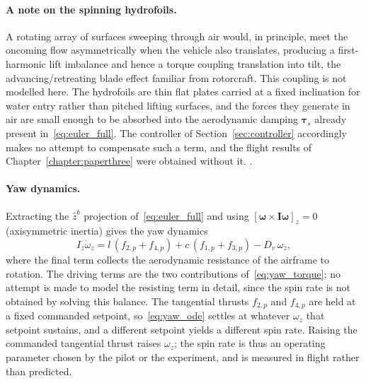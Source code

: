 \paragraph{A note on the spinning hydrofoils.}
A rotating array of surfaces sweeping through air would, in principle, meet the
oncoming flow asymmetrically when the vehicle also translates, producing a
first-harmonic lift imbalance and hence a torque coupling translation into tilt, the advancing/retreating blade effect familiar from rotorcraft.  This
coupling is not modelled here.  The hydrofoils are thin flat plates carried at
a fixed inclination for water entry rather than pitched lifting surfaces, and
the forces they generate in air are small enough to be absorbed into the
aerodynamic damping $\boldsymbol{\tau}_s$ already present
in~\eqref{eq:euler_full}.  The controller of Section~\ref{sec:controller}
accordingly makes no attempt to compensate such a term, and the flight results
of Chapter~\ref{chapter:paperthree} were obtained without it.  .

\paragraph{Yaw dynamics.}
Extracting the $\hat{z}^b$ projection of~\eqref{eq:euler_full} and using
$[\boldsymbol{\omega}\times\boldsymbol{I}\boldsymbol{\omega}]_z = 0$
(axisymmetric inertia) gives the yaw dynamics
\begin{equation}
    I_z\dot{\omega}_z
        = l\,(f_{2,p} + f_{4,p})
          + c\,(f_{1,p} + f_{3,p})
          - D_v\,\omega_z,
    \label{eq:yaw_ode}
\end{equation}
where the final term collects the aerodynamic resistance of the airframe to
rotation.  The driving terms are the two contributions
of~\eqref{eq:yaw_torque}; no attempt is made to model the resisting term in
detail, since the spin rate is not obtained by solving this balance.  The
tangential thrusts $f_{2,p}$ and $f_{4,p}$ are held at a fixed commanded
setpoint, so~\eqref{eq:yaw_ode} settles at whatever $\omega_z$ that setpoint
sustains, and a different setpoint yields a different spin rate.  Raising the
commanded tangential thrust raises $\omega_z$; the spin rate is thus an
operating parameter chosen by the pilot or the experiment, and is measured in
flight rather than predicted.

